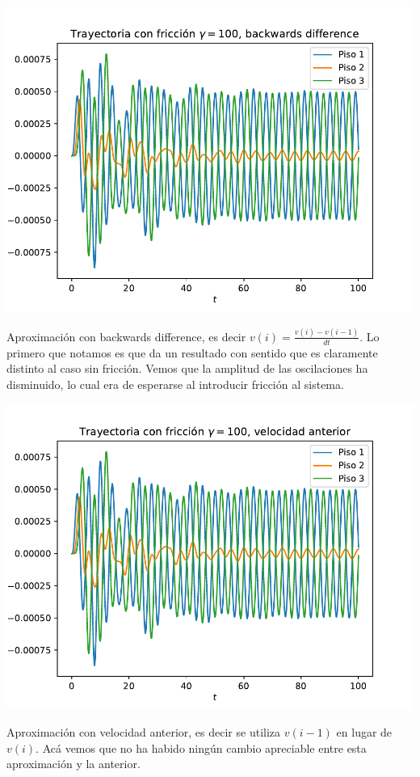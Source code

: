 \documentclass[11pt,letterpaper]{exam}
\begin{document}
\begin{center}
\includegraphics[width=14cm]{3_Edificio_bono.pdf}
\end{center}
Aproximación con backwards difference, es decir $v(i)=\frac{v(i)-v(i-1)}{dt}$. Lo primero que notamos es que da un resultado con sentido que es claramente distinto al caso sin fricción. Vemos que la amplitud de las oscilaciones ha disminuido, lo cual era de esperarse al introducir fricción al sistema.
\begin{center}
\includegraphics[width=14cm]{3_Edificio_bono1.pdf}
\end{center}
Aproximación con velocidad anterior, es decir se utiliza $v(i-1)$ en lugar de $v(i)$. Acá vemos que no ha habido ningún cambio apreciable entre esta aproximación y la anterior. 
\end{document}
